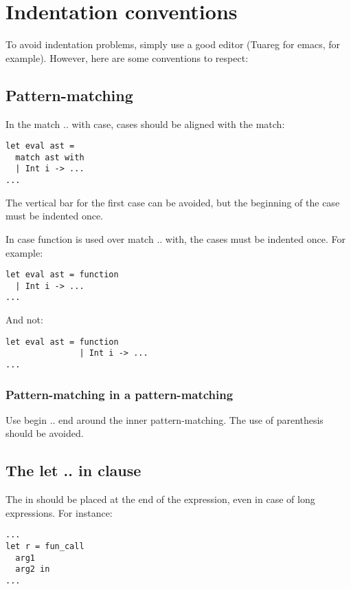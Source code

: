 \documentclass{article}
\begin{document}
\section{Indentation conventions}

To avoid indentation problems, simply use a good editor (Tuareg for emacs, for
example). However, here are some conventions to respect:

\subsection*{Pattern-matching}

In the \textsf{match .. with} case, cases should be aligned with the
\textsf{match}:

\begin{verbatim}
let eval ast =
  match ast with
  | Int i -> ...
...
\end{verbatim}

The vertical bar for the first case can be avoided, but the beginning of the
case must be indented once.

In case \textsf{function} is used over \textsf{match .. with}, the cases must be
indented once. For example:

\begin{verbatim}
let eval ast = function
  | Int i -> ...
...
\end{verbatim}

And not:


\begin{verbatim}
let eval ast = function
               | Int i -> ...
...
\end{verbatim}

\subsubsection*{Pattern-matching in a pattern-matching}

\medskip

Use \textsf{begin .. end} around the inner pattern-matching. The use of
parenthesis should be avoided.

\subsection*{The \textsf{let .. in} clause}

The \textsf{in} should be placed at the end of the expression, even in case of
long expressions. For instance:

\begin{verbatim}
...
let r = fun_call
  arg1
  arg2 in
...
\end{verbatim}
\end{document}
